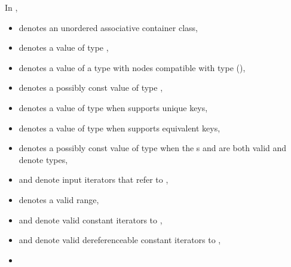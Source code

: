 \documentclass{wg21}
\begin{document}
\pnum
{}%
%
%
%
%
%
In ,
\begin{itemize}
    \item
     denotes an unordered associative container class,
    \item
     denotes a value of type ,
    \item
     denotes a value of a type with nodes compatible
    with type  (),
    \item
     denotes a possibly const value of type ,
    \item
     denotes a value of type 
    when  supports unique keys,
    \item
     denotes a value of type 
    when  supports equivalent keys,
    \item
     denotes a possibly const value of type 
    when the s
     and
    are both valid and denote types,
    \item
     and  denote input iterators
    that refer to ,
    \item
    \tcode{[i, j)} denotes a valid range,
    \item
     and  denote valid constant iterators to ,
    \item
     and  denote
    valid dereferenceable constant iterators to ,
    \item

\end{itemize}
\end{document}
